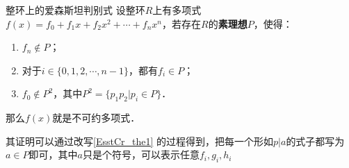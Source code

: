 \begin{theorem}{整环上的爱森斯坦判别式}
设整环$R$上有多项式$f(x)=f_0+f_1x+f_2x^2+\cdots+f_nx^n$，若存在$R$的\textbf{素理想}$P$，使得：
\begin{enumerate}
\item $f_n\not\in P$；
\item 对于$i\in\{0, 1, 2, \cdots, n-1\}$，都有$f_i\in P$；
\item $f_0\not\in P^2$，其中$P^2=\{p_1p_2|p_i\in P\}$．
\end{enumerate}
那么$f(x)$就是不可约多项式．
\end{theorem}

其证明可以通过改写\autoref{EsstCr_the1} 的过程得到，把每一个形如$p|a$的式子都写为$a\in P$即可，其中$a$只是个符号，可以表示任意$f_i, g_i, h_i$





